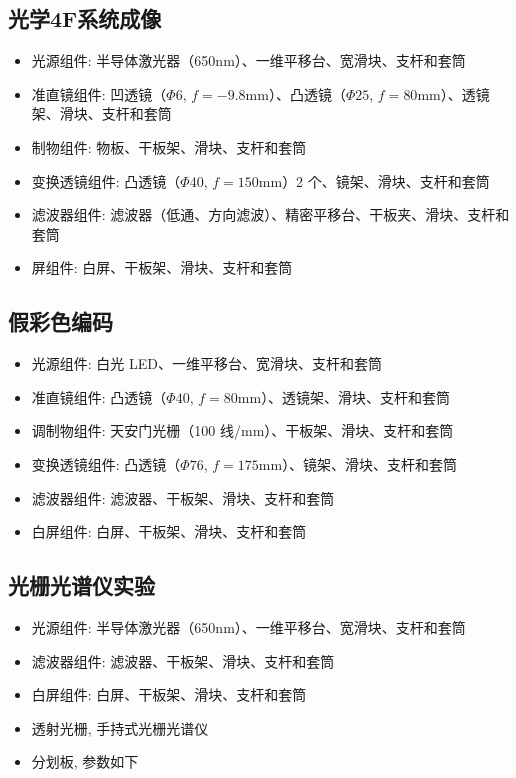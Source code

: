 \documentclass[zihao=5, UTF8]{article}
\theoremstyle{MyLineTheoremStyle} %
\theoremstyle{MyBlockTheoremStyle} %
\theoremstyle{MySubsubsectionStyle} %
\begin{document}
\subsection{光学4F系统成像}
\begin{itemize}
    \item 光源组件: 半导体激光器（650nm）、一维平移台、宽滑块、支杆和套筒
    \item 准直镜组件: 凹透镜（$\Phi 6$, $f=-9.8\text{mm}$）、凸透镜（$\Phi 25$, $f=80\text{mm}$）、透镜架、滑块、支杆和套筒
    \item 制物组件: 物板、干板架、滑块、支杆和套筒
    \item 变换透镜组件: 凸透镜（$\Phi 40$, $f=150\text{mm}$）2 个、镜架、滑块、支杆和套筒
    \item 滤波器组件: 滤波器（低通、方向滤波）、精密平移台、干板夹、滑块、支杆和套筒
    \item 屏组件: 白屏、干板架、滑块、支杆和套筒
\end{itemize}

\subsection{假彩色编码}
\begin{itemize}
    \item 光源组件: 白光 LED、一维平移台、宽滑块、支杆和套筒
    \item 准直镜组件: 凸透镜（$\Phi 40$, $f=80\text{mm}$）、透镜架、滑块、支杆和套筒
    \item 调制物组件: 天安门光栅（100 线/mm）、干板架、滑块、支杆和套筒
    \item 变换透镜组件: 凸透镜（$\Phi 76$, $f=175\text{mm}$）、镜架、滑块、支杆和套筒
    \item 滤波器组件: 滤波器、干板架、滑块、支杆和套筒
    \item 白屏组件: 白屏、干板架、滑块、支杆和套筒
\end{itemize}

\subsection{光栅光谱仪实验}
\begin{itemize}
    \item 光源组件: 半导体激光器（650nm）、一维平移台、宽滑块、支杆和套筒
    \item 滤波器组件: 滤波器、干板架、滑块、支杆和套筒
    \item 白屏组件: 白屏、干板架、滑块、支杆和套筒
    \item 透射光栅, 手持式光栅光谱仪
    \item 分划板, 参数如下
\end{itemize}
\end{document}
